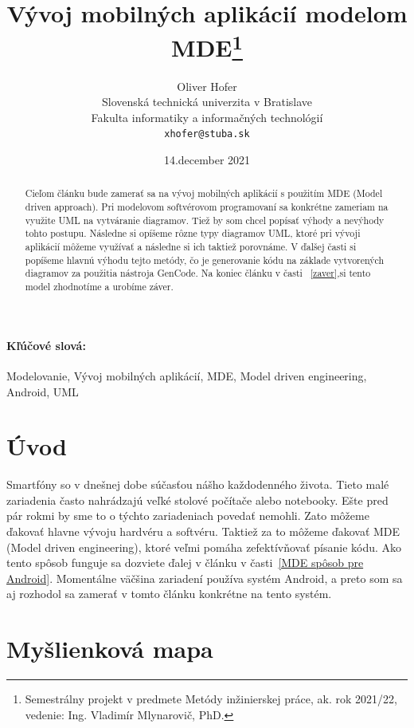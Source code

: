 \documentclass[10pt,twoside,slovak,a4paper]{article}
\title{Vývoj mobilných aplikácií modelom MDE\thanks{Semestrálny projekt v predmete Metódy inžinierskej práce, ak. rok 2021/22, vedenie: Ing. Vladimír Mlynarovič, PhD.}} %
\author{Oliver Hofer\\[2pt]
	{\small Slovenská technická univerzita v Bratislave}\\
	{\small Fakulta informatiky a informačných technológií}\\
	{\small \texttt{xhofer@stuba.sk}}
	}
\date{\small 14.december  2021} %
\begin{document}
\maketitle

\begin{abstract}
Cieľom článku bude zamerať sa na vývoj mobilných aplikácií s použitím MDE (Model driven approach). Pri modelovom softvérovom programovaní sa konkrétne zameriam na využite UML na vytváranie diagramov. Tiež by som chcel popísať výhody a nevýhody tohto postupu. Následne si opíšeme rôzne typy diagramov UML, ktoré pri vývoji aplikácií môžeme využívať a následne si ich taktiež porovnáme. V ďalšej časti si popíšeme hlavnú výhodu tejto metódy, čo je generovanie kódu na základe vytvorených diagramov za použitia nástroja GenCode. Na koniec článku v časti ~\ref{zaver},si tento model zhodnotíme a urobíme záver.
\end{abstract}
\paragraph{Kľúčové slová:} Modelovanie, Vývoj mobilných aplikácií, MDE, Model driven engineering, Android, UML


\section{Úvod}

Smartfóny so v dnešnej dobe súčasťou nášho každodenného života. Tieto malé zariadenia často nahrádzajú veľké stolové počítače alebo notebooky. Ešte pred pár rokmi by sme to o týchto zariadeniach povedať nemohli. Zato môžeme ďakovať hlavne vývoju hardvéru a softvéru. \newline
Taktiež za to môžeme ďakovať MDE (Model driven engineering), ktoré veľmi pomáha zefektívňovať písanie kódu. Ako tento spôsob funguje sa dozviete ďalej v článku v časti~\ref{MDE spôsob pre Android}.\newline
Momentálne väčšina zariadení používa systém Android, a preto som sa aj rozhodol sa zamerať v tomto článku konkrétne na tento systém.

\newpage
\section{Myšlienková mapa} \label{Myšlienková mapa}
\end{document}
